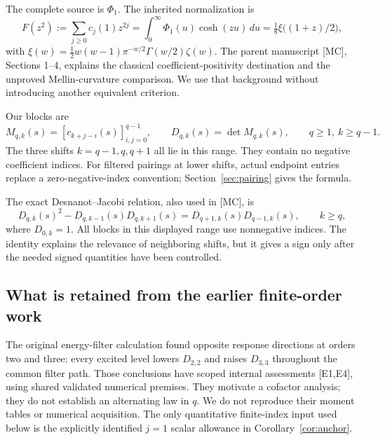 \documentclass[11pt,letterpaper]{article}
\numberwithin{equation}{section}
\theoremstyle{remark}
\newcommand{\dd}{\,d}
\newcommand{\evid}[1]{\textsf{[#1]}}
\begin{document}
The complete source is \(\Phi_1\). The inherited normalization is
\begin{equation}
 F(z^2):=\sum_{j\ge0}c_j(1)z^{2j}
 =\int_0^\infty\Phi_1(u)\cosh(zu)\dd u
 =\tfrac18\xi\bigl((1+z)/2\bigr),
 \label{eq:xi}
\end{equation}
with \(\xi(w)=\tfrac12w(w-1)\pi^{-w/2}\Gamma(w/2)\zeta(w)\).
The parent manuscript \evid{MC}, Sections 1--4, explains the
classical coefficient-positivity destination and the unproved
Mellin-curvature comparison. We use that background without introducing
another equivalent criterion.

Our blocks are
\begin{equation}
 M_{q,k}(s)=[c_{k+j-i}(s)]_{i,j=0}^{q-1},\qquad
 D_{q,k}(s)=\det M_{q,k}(s),\qquad q\ge1,\ k\ge q-1.
 \label{eq:blocks}
\end{equation}
The three shifts \(k=q-1,q,q+1\) all lie in this range. They contain no
negative coefficient indices. For filtered pairings at lower shifts,
actual endpoint entries replace a zero-negative-index convention;
Section~\ref{sec:pairing} gives the formula.

The exact Desnanot--Jacobi relation, also used in \evid{MC}, is
\begin{equation}
 D_{q,k}(s)^2-D_{q,k-1}(s)D_{q,k+1}(s)
 =D_{q+1,k}(s)D_{q-1,k}(s),\qquad k\ge q,
 \label{eq:dj}
\end{equation}
where \(D_{0,k}=1\). All blocks in this displayed range use
nonnegative indices. The identity explains the relevance of neighboring
shifts, but it gives a sign only after the needed signed quantities have
been controlled.

\subsection{What is retained from the earlier finite-order work}

The original energy-filter calculation found opposite response
directions at orders two and three: every excited level lowers
\(D_{2,2}\) and raises \(D_{3,3}\) throughout the common filter path.
Those conclusions have scoped internal assessments \evid{E1,E4},
using shared validated numerical premises. They motivate a cofactor
analysis; they do not establish an alternating law in \(q\).
We do not reproduce their moment tables or numerical acquisition.
The only quantitative finite-index input used below is the explicitly
identified \(j=1\) scalar allowance in
Corollary~\ref{cor:anchor}.
\end{document}

